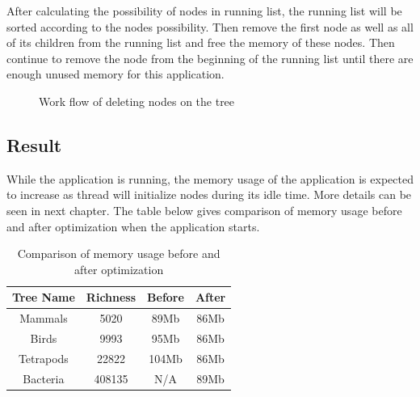 \documentclass[MSc]{icldt}
\begin{document}
After calculating the possibility of nodes in running list, the running list will be sorted according to the nodes possibility. Then remove the first node as well as all of its children from the running list and free the memory of these nodes. Then continue to remove the node from the beginning of the running list until there are enough unused memory for this application.

\begin{figure} [H]
\caption{Work flow of deleting nodes on the tree}
\end{figure}

\subsection{Result}

While the application is running, the memory usage of the application is expected to increase as thread will initialize nodes during its idle time. More details can be seen in next chapter. The table below gives comparison of memory usage before and after optimization when the application starts.

\begin{table} [H]
	\centering %
	\begin{tabular}{|c c c c|} %
		\hline %
		Tree Name & Richness  & Before & After\\ %
		\hline  %
		Mammals & 5020 & 89Mb   & 86Mb\\  %
		\hline
		Birds & 9993 &  95Mb & 86Mb\\
		\hline
		Tetrapods & 22822 & 104Mb & 86Mb\\ 
		\hline %
		Bacteria & 408135 & N/A & 89Mb \\ [1ex] %
		\hline
	\end{tabular}
	\label{table:nonlin} %
	\caption{Comparison of memory usage before and after optimization} %
\end{table}
\end{document}
